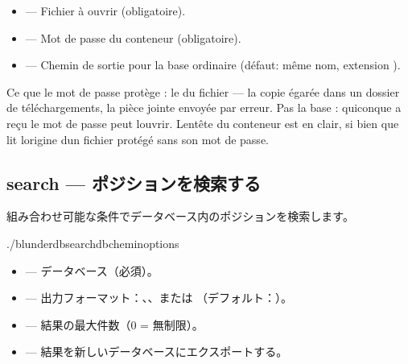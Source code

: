 \documentclass[letterpaper,10pt,dvipdfmx]{sphinxmanual}
\begin{document}
\sphinxAtStartPar
{}
\begin{itemize}
\item {} 
\sphinxAtStartPar
{} — Fichier  à ouvrir (obligatoire).

\item {} 
\sphinxAtStartPar
{} — Mot de passe du conteneur (obligatoire).

\item {} 
\sphinxAtStartPar
{} — Chemin de sortie pour la base ordinaire (défaut: même nom,
extension ).

\end{itemize}

\sphinxAtStartPar
Ce que le mot de passe protège : le  du fichier — la copie égarée
dans un dossier de téléchargements, la pièce jointe envoyée par erreur. Pas la
base : quiconque a reçu le mot de passe peut l\textquotesingle{}ouvrir. L\textquotesingle{}en\sphinxhyphen{}tête du conteneur
est en clair, si bien que  lit l\textquotesingle{}origine d\textquotesingle{}un fichier
protégé sans son mot de passe.


\subsection{search — ポジションを検索する}
\label{\detokenize{cli:search-rechercher-des-positions}}
\sphinxAtStartPar
組み合わせ可能な条件でデータベース内のポジションを検索します。

\begin{sphinxVerbatim}[commandchars=\\\{\}]
./blunderdbsearch\PYGZhy{}\PYGZhy{}db\PYGZlt{}chemin\PYGZgt{}\PYG{o}{[}options\PYG{o}{]}
\end{sphinxVerbatim}

\sphinxAtStartPar
{}
\begin{itemize}
\item {} 
\sphinxAtStartPar
{} — データベース（必須）。

\item {} 
\sphinxAtStartPar
{} — 出力フォーマット：、、または （デフォルト：）。

\item {} 
\sphinxAtStartPar
{} — 結果の最大件数（0 = 無制限）。

\item {} 
\sphinxAtStartPar
{} — 結果を新しいデータベースにエクスポートする。

\end{itemize}
\end{document}
